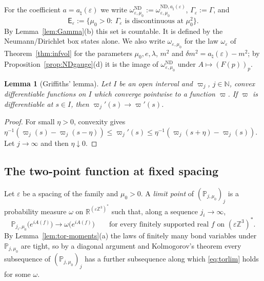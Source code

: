 \documentclass[11pt]{amsart}
\theoremstyle{plain}
\newtheorem{lemma}[theorem]{Lemma}
\theoremstyle{definition}
\theoremstyle{remark}
\numberwithin{equation}{section}
\newcommand{\R}{\mathbb{R}}
\newcommand{\Z}{\mathbb{Z}}
\newcommand{\N}{\mathbb{N}}
\newcommand{\eps}{\varepsilon}
\begin{document}
For the coefficient $a=a_\natural(\eps)$ we write $\omega^{\mathrm{ND}}_{\eps,\mu_0}:=\omega^{\mathrm{ND},a_\natural(\eps)}_{\eps,\mu_0}$, $\Gamma_\eps:=\Gamma$, and
\begin{equation}\label{eq:Eeps}
\mathsf E_\eps:=\big\{\mu_0>0:\ \Gamma_\eps\text{ is discontinuous at }\mu_0^2\big\}.
\end{equation}
By Lemma~\ref{lem:Gamma}(b) this set is countable. It is defined by the Neumann/Dirichlet box states alone. We also write $\omega_{\eps,\mu_0}$ for the law $\omega_\eps$ of Theorem~\ref{thm:infvol} for the parameters $\mu_0,e,\lambda$, $m^2$ and $\delta m^2=a_\natural(\eps)-m^2$; by Proposition~\ref{prop:NDgauge}(d) it is the image of $\omega^{\mathrm{ND}}_{\eps,\mu_0}$ under $A\mapsto(F(p))_p$.

\begin{lemma}[{Griffiths' lemma}]\label{lem:griffiths}
Let $I$ be an open interval and $\varpi_j$, $j\in\N$, convex differentiable functions on $I$ which converge pointwise to a function $\varpi$. If $\varpi$ is differentiable at $s\in I$, then $\varpi_j'(s)\to\varpi'(s)$.
\end{lemma}

\begin{proof}
For small $\eta>0$, convexity gives $\eta^{-1}(\varpi_j(s)-\varpi_j(s-\eta))\le\varpi_j'(s)\le\eta^{-1}(\varpi_j(s+\eta)-\varpi_j(s))$. Let $j\to\infty$ and then $\eta\downarrow0$.
\end{proof}

\subsection{The two-point function at fixed spacing}
Let $\eps$ be a spacing of the family and $\mu_0>0$. A \emph{limit point} of $(\mathbb P_{j,\mu_0})_j$ is a probability measure $\omega$ on $\R^{(\eps\Z^3)^*}$ such that, along a sequence $j_i\to\infty$,
\begin{equation}\label{eq:torlim}
\mathbb P_{j_i,\mu_0}\big(e^{iA(f)}\big)\to\omega\big(e^{iA(f)}\big)\qquad\text{for every finitely supported real }f\text{ on }(\eps\Z^3)^*.
\end{equation}
By Lemma~\ref{lem:tor-moments}(a) the laws of finitely many bond variables under $\mathbb P_{j,\mu_0}$ are tight, so by a diagonal argument and Kolmogorov's theorem every subsequence of $(\mathbb P_{j,\mu_0})_j$ has a further subsequence along which \eqref{eq:torlim} holds for some $\omega$.
\end{document}
